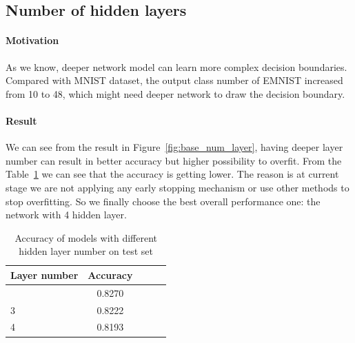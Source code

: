 \documentclass{article}
\begin{document}
\subsection{Number of hidden layers}

\paragraph{Motivation} As we know, deeper network model can learn more complex decision boundaries\citep{Goodfellow-et-al-2016}. Compared with MNIST dataset, the output class number of EMNIST increased from 10 to 48, which might need deeper network to draw the decision boundary. 
\paragraph{Result}
We can see from the result in Figure~\ref{fig:base_num_layer}, having deeper layer number can result in better accuracy but higher possibility to overfit. From the Table~\ref{tab:layer_num} we can see that the accuracy is getting lower. The reason is at current stage we are not applying any early stopping mechanism or use other methods to stop overfitting. So we finally choose the best overall performance one: the network with 4 hidden layer.
 

\begin{table}[tb]
\vskip 3mm
\begin{center}
\begin{small}
\begin{sc}
\begin{tabular}{lcccr}
\hline
\abovespace\belowspace
Layer number & Accuracy \\
\hline
\abovespace
2    	& 0.8270 	\\
3	 	& 0.8222 	\\
4	  	& 0.8193 	\\

\hline
\end{tabular}
\end{sc}
\end{small}
\caption{Accuracy of models with different hidden layer number on test set}
\label{tab:layer_num}
\end{center}
\vskip -3mm
\end{table}
\end{document}
